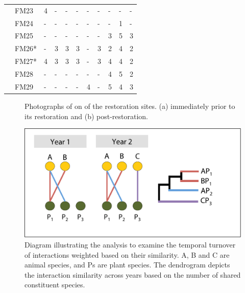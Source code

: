 \documentclass[12pt]{article}
\begin{document}
\begin{table}
\begin{tabular}{lllllllllll}
    &FM23 & 4 & - & - & - & - & - & - & - & -\\
    &FM24 & - & - & - & - & - & - & - & 1 & -\\
    &FM25 & - & - & - & - & - & - & 3 & 5 & 3\\
    &FM26* & - & 3 & 3 & 3 & - & 3 & 2 & 4 & 2\\
    &FM27* & 4 & 3 & 3 & 3 & - & 3 & 4 & 4 & 2\\
    &FM28 & - & - & - & - & - & - & 4 & 5 & 2\\
    &FM29 & - & - & - & - & 4 & - & 5 & 4 & 3\\
    \hline
  \end{tabular}
  \label{tab:controls}
\end{table}
\clearpage


\begin{figure}[!tbp]
  \centering
  \hfill
  \caption{Photographs of on of the restoration sites. (a) immediately prior to its restoration and (b) post-restoration.}
\end{figure}
\clearpage


\clearpage
\begin{figure}
  \centering
  \includegraphics[width=.8\textwidth]{figures/scheme.pdf}
  \caption{Diagram illustrating the analysis to examine the temporal
    turnover of interactions weighted based on their similarity. A, B
    and C are animal species, and Ps are plant species. The dendrogram
    depicts the interaction similarity across years based on the
    number of shared constituent species.}
  \label{fig:methods}
\end{figure}
\clearpage
\end{document}
